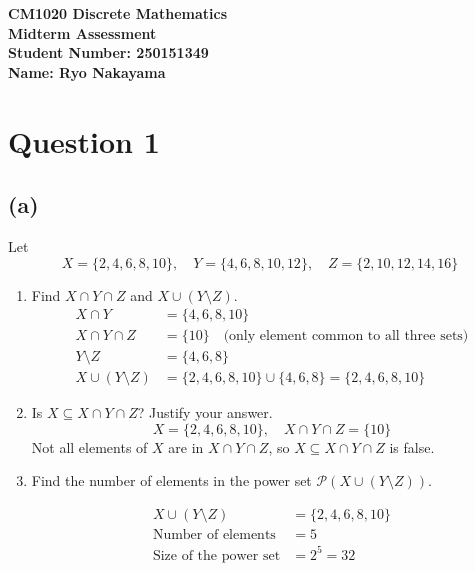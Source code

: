 \documentclass{article}
\begin{document}
\begin{center}
\Large\textbf{CM1020 Discrete Mathematics}\\
\large\textbf{Midterm Assessment}\\
\vspace{0.5cm}
\large\textbf{Student Number: 250151349}\\
\large\textbf{Name: Ryo Nakayama}\\
\vspace{1cm}
\end{center}

\section*{Question 1}

\subsection*{(a)}

Let 
\[
X = \{2, 4, 6, 8, 10\}, \quad Y = \{4, 6, 8, 10, 12\}, \quad Z = \{2, 10, 12, 14, 16\}
\]

\begin{enumerate}[label=\roman*.]

\item Find $X \cap Y \cap Z$ and $X \cup (Y \setminus Z)$.
\[
\begin{aligned}
X \cap Y &= \{4, 6, 8, 10\} \\
X \cap Y \cap Z &= \{10\} \quad \text{(only element common to all three sets)} \\
Y \setminus Z &= \{4, 6, 8\} \\
X \cup (Y \setminus Z) &= \{2, 4, 6, 8, 10\} \cup \{4, 6, 8\} = \{2, 4, 6, 8, 10\}
\end{aligned}
\]

\item Is $X \subseteq X \cap Y \cap Z$? Justify your answer.
\[
X = \{2, 4, 6, 8, 10\}, \quad X \cap Y \cap Z = \{10\}
\]
Not all elements of $X$ are in $X \cap Y \cap Z$, so $X \subseteq X \cap Y \cap Z$ is false.

\item Find the number of elements in the power set $\mathcal{P}(X \cup (Y \setminus Z))$.

\[
\begin{aligned}
X \cup (Y \setminus Z) &= \{2, 4, 6, 8, 10\} \\
\text{Number of elements} &= 5 \\
\text{Size of the power set} &= 2^5 = \boxed{32}
\end{aligned}
\]

\end{enumerate}
\end{document}
